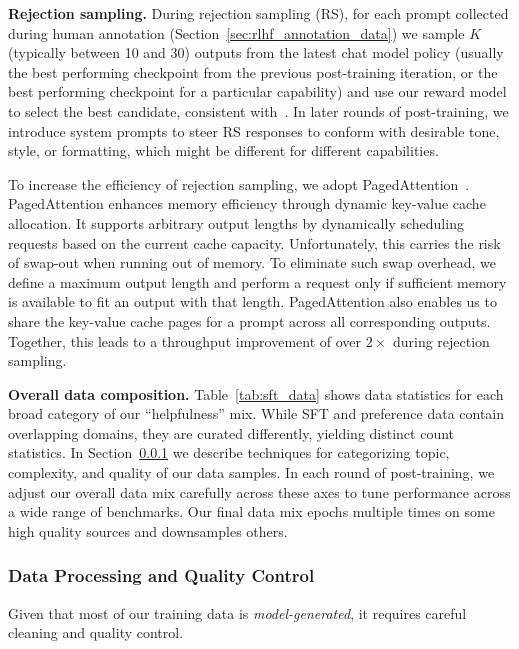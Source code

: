 \textbf{Rejection sampling.}
During rejection sampling (RS), for each prompt collected during human annotation (Section~\ref{sec:rlhf_annotation_data}) we sample $K$ (typically between 10 and 30) outputs from the latest chat model policy (usually the best performing checkpoint from the previous post-training iteration, or the best performing checkpoint for a particular capability) and use our reward model to select the best candidate, consistent with~\citet{constitutional-ai-bai}. 
In later rounds of post-training, we introduce system prompts to steer RS responses to conform with desirable tone, style, or formatting, which might be different for different capabilities. 

To increase the efficiency of rejection sampling, we adopt PagedAttention~\citep{kwon2023efficient}.
PagedAttention enhances memory efficiency through dynamic key-value cache allocation. 
It supports arbitrary output lengths by dynamically scheduling requests based on the current cache capacity.
Unfortunately, this carries the risk of swap-out when running out of memory. 
To eliminate such swap overhead, we define a maximum output length and perform a request only if sufficient memory is available to fit an output with that length.
PagedAttention also enables us to share the key-value cache pages for a prompt across all corresponding outputs.
Together, this leads to a throughput improvement of over $2 \times$ during rejection sampling.


\textbf{Overall data composition.} Table~\ref{tab:sft_data} shows data statistics for each broad category of our ``helpfulness'' mix. 
While SFT and preference data contain overlapping domains, they are curated differently, yielding distinct count statistics. In Section~\ref{subsubsec:data_clean} we describe techniques for categorizing topic, complexity, and quality of our data samples. In each round of post-training, we adjust our overall data mix carefully across these axes to tune performance across a wide range of benchmarks. Our final data mix epochs multiple times on some high quality sources and downsamples others.




\subsubsection{Data Processing and Quality Control}
\label{subsubsec:data_clean} 

Given that most of our training data is \emph{model-generated}, it requires careful cleaning and quality control. 


